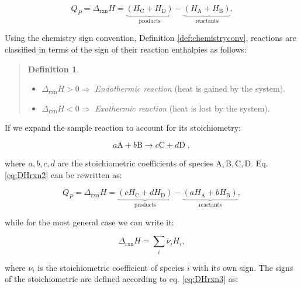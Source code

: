 \documentclass[
  9pt,
]{extbook}
\providecommand{\tightlist}{%
  \setlength{\itemsep}{0pt}\setlength{\parskip}{0pt}}
\theoremstyle{definition}
\newtheorem{definition}{Definition}[chapter]
\theoremstyle{definition}
\theoremstyle{definition}
\theoremstyle{remark}
\begin{document}
\begin{equation}
  Q_P = \Delta_{\text{rxn}} H = \underbrace{ \left (H_{\mathrm{C}}+H_{\mathrm{D}} \right) }_{\text{products}} - \underbrace{\left( H_{\mathrm{A}}+H_{\mathrm{B}}\right)}_{\text{reactants}}.
  \label{eq:DHrxn2}
\end{equation}

Using the chemistry sign convention, Definition \ref{def:chemistryconv}, reactions are classified in terms of the sign of their reaction enthalpies as follows:

\begin{quote}
\begin{definition}
\protect\hypertarget{def:exoendo}{}{\label{def:exoendo} }\(\;\)

\begin{itemize}
\tightlist
\item
  \(\Delta_{\text{rxn}} H > 0 \Rightarrow\) \emph{Endothermic reaction} (heat is gained by the system).
\item
  \(\Delta_{\text{rxn}} H < 0 \Rightarrow\) \emph{Exothermic reaction} (heat is lost by the system).
\end{itemize}
\end{definition}
\end{quote}

If we expand the sample reaction to account for its stoichiometry:

\[ a\mathrm{A} + b\mathrm{B} \rightarrow c\mathrm{C} + d\mathrm{D}\; , \]

where \(a,b,c,d\) are the stoichiometric coefficients of species \(\mathrm{A,B,C,D}\). Eq. \eqref{eq:DHrxn2} can be rewritten as:

\begin{equation}
  Q_P = \Delta_{\text{rxn}} H = \underbrace{\left( cH_{\mathrm{C}}+dH_{\mathrm{D}} \right) }_{\text{products}} - \underbrace{ \left( aH_{\mathrm{A}}+bH_{\mathrm{B}} \right)}_{\text{reactants}},
  \label{eq:DHrxn3}
\end{equation}

while for the most general case we can write it:

\begin{equation}
  \Delta_{\text{rxn}} H = \sum_i \nu_i H_i,
  \label{eq:DHrxn4}
\end{equation}

where \(\nu_i\) is the stoichiometric coefficient of species \(i\) with its own sign. The signs of the stoichiometric are defined according to eq. \eqref{eq:DHrxn3} as:
\end{document}
